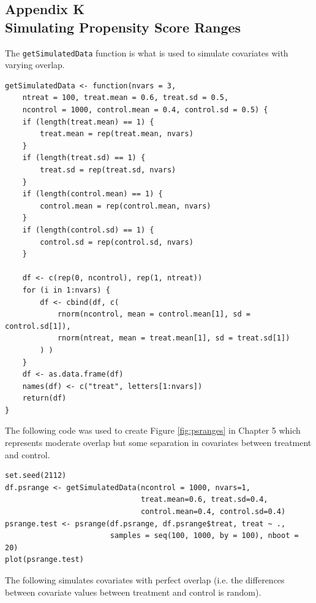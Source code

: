 \documentclass[letterpaper,12p,twoside]{article} %
\begin{document}
\clearpage
{}
\subsection*{Appendix K\\Simulating Propensity Score Ranges}

\begin{singlespace}

\noindent The \texttt{getSimulatedData} function is what is used to simulate covariates with varying overlap.

\begin{verbatim}
getSimulatedData <- function(nvars = 3, 
    ntreat = 100, treat.mean = 0.6, treat.sd = 0.5, 
    ncontrol = 1000, control.mean = 0.4, control.sd = 0.5) {
    if (length(treat.mean) == 1) {
        treat.mean = rep(treat.mean, nvars)
    }
    if (length(treat.sd) == 1) {
        treat.sd = rep(treat.sd, nvars)
    }
    if (length(control.mean) == 1) {
        control.mean = rep(control.mean, nvars)
    }
    if (length(control.sd) == 1) {
        control.sd = rep(control.sd, nvars)
    }
    
    df <- c(rep(0, ncontrol), rep(1, ntreat))
    for (i in 1:nvars) {
        df <- cbind(df, c(
            rnorm(ncontrol, mean = control.mean[1], sd = control.sd[1]), 
            rnorm(ntreat, mean = treat.mean[1], sd = treat.sd[1])
        ) )
    }
    df <- as.data.frame(df)
    names(df) <- c("treat", letters[1:nvars])
    return(df)
}
\end{verbatim}

\noindent The following code was used to create Figure \ref{fig:psranges} in Chapter 5 which represents moderate overlap but some separation in covariates between treatment and control.


\begin{verbatim}
set.seed(2112)
df.psrange <- getSimulatedData(ncontrol = 1000, nvars=1,
                               treat.mean=0.6, treat.sd=0.4,
                               control.mean=0.4, control.sd=0.4)
psrange.test <- psrange(df.psrange, df.psrange$treat, treat ~ ., 
                        samples = seq(100, 1000, by = 100), nboot = 20)
plot(psrange.test)
\end{verbatim}

\noindent The following simulates covariates with perfect overlap (i.e. the differences between covariate values between treatment and control is random).


\end{singlespace}
\end{document}
